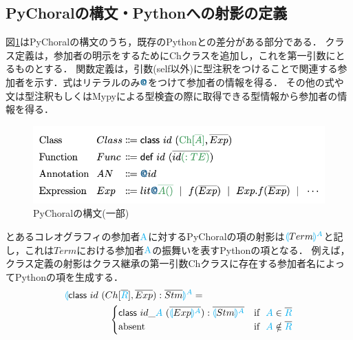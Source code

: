 \documentclass{resume}
\newcommand{\projection}[2]{{\color{cyan}\llparenthesis}#1{\color{cyan}\rrparenthesis^#2}}
\newcommand{\mblue}[1]{\textbf{\textsf{\color{MidnightBlue}#1}}}
\newcommand{\cyan}[1]{\color{cyan}#1}
\begin{document}
\subsection{PyChoralの構文・Pythonへの射影の定義}
図\ref{syntax}はPyChoralの構文のうち，既存のPythonとの差分がある部分である．
クラス定義は，参加者の明示をするためにChクラスを追加し，これを第一引数にとるものとする．
関数定義は，引数(self以外)に型注釈をつけることで関連する参加者を示す．式はリテラルのみ$\mblue{@}$をつけて参加者の情報を得る．
その他の式や文は型注釈もしくはMypyによる型検査の際に取得できる型情報から参加者の情報を得る．
\vspace{-8pt}
\begin{figure}[H]
  \includegraphics[scale=0.67]{image/diffpy.png}
  \caption{PyChoralの構文(一部)}
  \label{syntax}
\end{figure}
\vspace{-20pt}
とあるコレオグラフィの参加者$\cyan{\text{A}}$に対するPyChoralの項の射影は$\projection{Term}{A}$と記し，これは$Term$における参加者$\cyan{\text{A}}$の振舞いを表すPythonの項となる．
例えば，クラス定義の射影はクラス継承の第一引数Chクラスに存在する参加者名によってPythonの項を生成する．
\begin{alignat*}{2} 
  &\projection{\textsf{class} ~id~(Ch[\overline{\cyan{R}}],\overline{Exp}):\overline{Stm}}{A}=\\
  &
  ~~~~~~~~~~~~~~\begin{cases}
    \textsf{class} ~id\_{\cyan{A}}~(\overline{\projection{Exp}{A}}):\overline{\projection{Stm}{A}} & \text{if}~~ {\cyan{A}} \in \overline{\cyan{R}}\\
    \text{absent} & \text{if}~~ {\cyan{A}} \notin \overline{\cyan{R}}\\
  \end{cases}
\end{alignat*}
\end{document}
